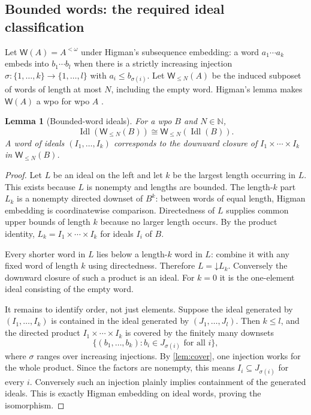 \documentclass[11pt,letterpaper]{article}
\theoremstyle{teal}
\newtheorem{lemma}[theorem]{Lemma}
\theoremstyle{definition}
\newcommand{\Idl}{\operatorname{Idl}}
\newcommand{\W}{\mathsf W}
\newcommand{\dn}{\mathord\downarrow}
\newcommand{\N}{\mathbb N}
\begin{document}
\subsection{Bounded words: the required ideal classification}
Let $\W(A)=A^{<\omega}$ under Higman's subsequence embedding: a word $a_1\cdots a_k$ embeds into $b_1\cdots b_l$ when there is a strictly increasing injection $\sigma:\{1,\ldots,k\}\to\{1,\ldots,l\}$ with $a_i\leq b_{\sigma(i)}$. Let $\W_{\leq N}(A)$ be the induced subposet of words of length at most $N$, including the empty word. Higman's lemma makes $\W(A)$ a wpo for wpo $A$ \cite{IdealApproach}.

\begin{lemma}[Bounded-word ideals]\label{lem:words}
For a wpo $B$ and $N\in\N$,
\begin{equation}\label{eq:word-commute}
 \Idl(\W_{\leq N}(B))\cong\W_{\leq N}(\Idl(B)).
\end{equation}
A word of ideals $(I_1,\ldots,I_k)$ corresponds to the downward closure of $I_1\times\cdots\times I_k$ in $\W_{\leq N}(B)$.
\end{lemma}
\begin{proof}
Let $L$ be an ideal on the left and let $k$ be the largest length occurring in $L$. This exists because $L$ is nonempty and lengths are bounded. The length-$k$ part $L_k$ is a nonempty directed downset of $B^k$: between words of equal length, Higman embedding is coordinatewise comparison. Directedness of $L$ supplies common upper bounds of length $k$ because no larger length occurs. By the product identity, $L_k=I_1\times\cdots\times I_k$ for ideals $I_i$ of $B$.

Every shorter word in $L$ lies below a length-$k$ word in $L$: combine it with any fixed word of length $k$ using directedness. Therefore $L=\dn L_k$. Conversely the downward closure of such a product is an ideal. For $k=0$ it is the one-element ideal consisting of the empty word.

It remains to identify order, not just elements. Suppose the ideal generated by $(I_1,\ldots,I_k)$ is contained in the ideal generated by $(J_1,\ldots,J_l)$. Then $k\leq l$, and the directed product $I_1\times\cdots\times I_k$ is covered by the finitely many downsets
\[
 \{(b_1,\ldots,b_k):b_i\in J_{\sigma(i)}\text{ for all }i\},
\]
where $\sigma$ ranges over increasing injections. By \cref{lem:cover}, one injection works for the whole product. Since the factors are nonempty, this means $I_i\subseteq J_{\sigma(i)}$ for every $i$. Conversely such an injection plainly implies containment of the generated ideals. This is exactly Higman embedding on ideal words, proving the isomorphism.
\end{proof}
\end{document}
